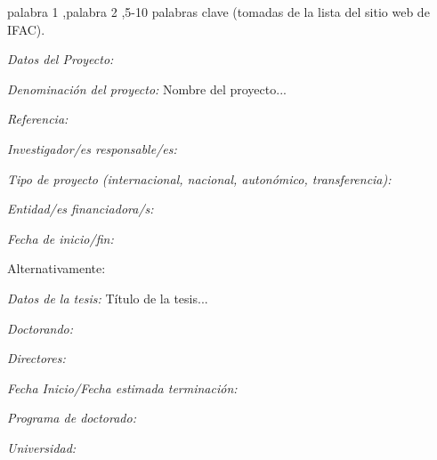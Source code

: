 \documentclass[final,5p,times,twocolumn,authoryear,10pt]{elsarticle}
\begin{document}
\begin{frontmatter}
\begin{abstract}
\fontsize{9.5pt}{11.4pt}\selectfont
\noindent\hspace{0.3cm}
Estas instrucciones constituyen una guia para la preparación de artículos para la revista RIAI. Utilice este documento como un conjunto de instrucciones. Por favor, utilice este documento como una "plantilla" para preparar su manuscrito. Para las directrices de envío, siga las instrucciones del sistema de envío de artículos de la página web de la revista. \emph{Copyright {\copyright} XXXX CEA.}
\end{abstract}

\begin{keyword}
\fontsize{9.5pt}{11.4pt}\selectfont

palabra 1 \sep palabra 2 \sep 5-10 palabras clave (tomadas de la lista del sitio web de IFAC).

\textit{Datos del Proyecto:}

\hspace{1.26cm}\textit{Denominaci\'on del proyecto:} Nombre del proyecto...

\hspace{1.26cm}\textit{Referencia:}

\hspace{1.26cm}\textit{Investigador/es responsable/es:}

\hspace{1.26cm}\textit{Tipo de proyecto (internacional, nacional, auton\'omico, transferencia):}

\hspace{1.26cm}\textit{Entidad/es financiadora/s:}

\hspace{1.26cm}\textit{Fecha de inicio/fin:}

Alternativamente:

\textit{Datos de la tesis:} Título de la tesis...

\hspace{1.26cm}\textit{Doctorando:}

\hspace{1.26cm}\textit{Directores:}

\hspace{1.26cm}\textit{Fecha Inicio/Fecha estimada terminaci\'on:}

\hspace{1.26cm}\textit{Programa de doctorado:}

\hspace{1.26cm}\textit{Universidad:}

\end{keyword}

\end{frontmatter}
\end{document}
